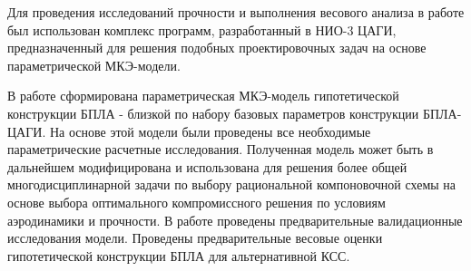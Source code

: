 Для проведения исследований прочности и выполнения весового анализа в работе был использован комплекс программ, разработанный в НИО-3 ЦАГИ, предназначенный для решения подобных проектировочных задач на основе параметрической МКЭ-модели.

В работе сформирована параметрическая МКЭ-модель гипотетической конструкции БПЛА - близкой по набору базовых параметров конструкции БПЛА-ЦАГИ. На основе этой модели были проведены все необходимые параметрические расчетные исследования. Полученная модель может быть в дальнейшем модифицирована и использована для решения более общей многодисциплинарной задачи по выбору рациональной компоновочной схемы на основе выбора оптимального компромиссного решения по условиям аэродинамики и прочности. В работе проведены предварительные валидационные исследования модели. Проведены предварительные весовые оценки гипотетической конструкции БПЛА для альтернативной КСС.   

 